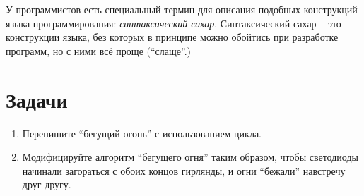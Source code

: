 \documentclass[../sparc.tex]{subfiles}
\begin{document}
У программистов есть специальный термин для описания подобных конструкций языка
программирования: \emph{синтаксический сахар}.  Синтаксический сахар -- это
конструкции языка, без которых в принципе можно обойтись при разработке
программ, но с ними всё проще (``слаще''.)

\section{Задачи}
\begin{enumerate}
\item Перепишите ``бегущий огонь'' с использованием цикла.
\item Модифицируйте алгоритм ``бегущего огня'' таким образом, чтобы светодиоды
  начинали загораться с обоих концов гирлянды, и огни ``бежали'' навстречу друг
  другу.
\end{enumerate}
\end{document}
